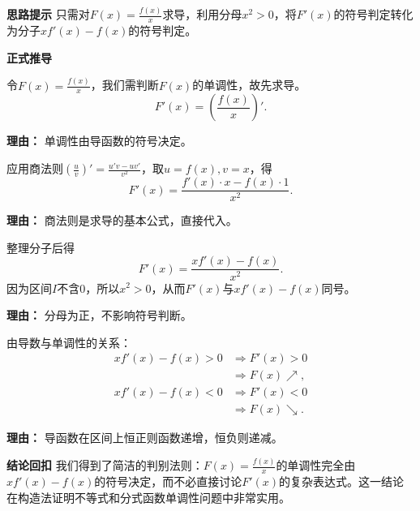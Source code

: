 \begin{proofbox}
	\textbf{\textcolor{CProof}{思路提示}}
	只需对$F(x)=\frac{f(x)}{x}$求导，利用分母$x^{2}>0$，将$F'(x)$的符号判定转化为分子$x f'(x)-f(x)$的符号判定。

	\medskip
	\textbf{\textcolor{CProof}{正式推导}}
	\begin{description}[style=nextline, leftmargin=2.8em, labelsep=0.5em, itemsep=0.55em]
		\item[\textbf{步骤一（构造函数求导）：}]
			令$F(x)=\frac{f(x)}{x}$，我们需判断$F(x)$的单调性，故先求导。
			\[
				F'(x)=\left(\frac{f(x)}{x}\right)'.
			\]
			\par\textbf{理由：} 单调性由导函数的符号决定。
		\item[\textbf{步骤二（商法则展开）：}]
			应用商法则$\left(\frac{u}{v}\right)'=\frac{u'v-uv'}{v^{2}}$，取$u=f(x),v=x$，得
			\[
				F'(x)=\frac{f'(x)\cdot x - f(x)\cdot 1}{x^{2}}.
			\]
			\par\textbf{理由：} 商法则是求导的基本公式，直接代入。
		\item[\textbf{步骤三（整理与判号）：}]
			整理分子后得
			\[
				F'(x)=\frac{x f'(x)-f(x)}{x^{2}}.
			\]
			因为区间$I$不含$0$，所以$x^{2}>0$，从而$F'(x)$与$x f'(x)-f(x)$同号。
			\par\textbf{理由：} 分母为正，不影响符号判断。
		\item[\textbf{步骤四（单调性判定）：}]
			由导数与单调性的关系：
			\[
				\begin{aligned}
					x f'(x)-f(x)>0 &\Rightarrow F'(x)>0 \\ &\Rightarrow F(x)\nearrow,
			\end{aligned}
			\]
			\[
				\begin{aligned}
					x f'(x)-f(x)<0 &\Rightarrow F'(x)<0 \\ &\Rightarrow F(x)\searrow.
			\end{aligned}
			\]
			\par\textbf{理由：} 导函数在区间上恒正则函数递增，恒负则递减。
	\end{description}

	\medskip
	\textbf{\textcolor{CProof}{结论回扣}}
	我们得到了简洁的判别法则：$F(x)=\frac{f(x)}{x}$的单调性完全由$x f'(x)-f(x)$的符号决定，而不必直接讨论$F'(x)$的复杂表达式。这一结论在构造法证明不等式和分式函数单调性问题中非常实用。
\end{proofbox}
